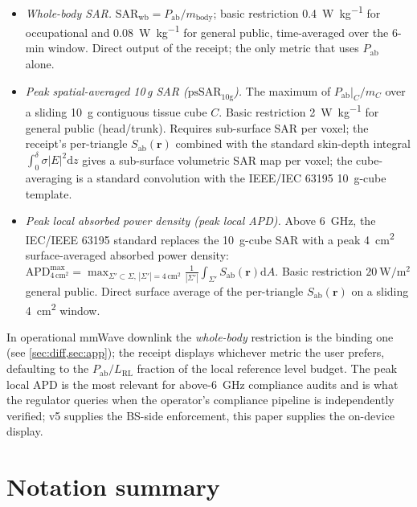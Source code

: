 \documentclass[11pt,a4paper]{article}
\theoremstyle{definition}
\newcommand{\rr}{\mathbf{r}}
\newcommand{\Sab}{S_{\mathrm{ab}}}
\newcommand{\diff}{\mathrm{d}}
\newcommand{\Pabs}{P_{\mathrm{ab}}}
\begin{document}
\begin{itemize}[leftmargin=1.6em,itemsep=2pt]
\item \emph{Whole-body SAR.}  $\mathrm{SAR}_{\mathrm{wb}}=
\Pabs/m_{\mathrm{body}}$; basic restriction
\SI{0.4}{\W\per\kg} for occupational and \SI{0.08}{\W\per\kg} for
general public, time-averaged over the 6-min window.  Direct
output of the receipt; the only metric that uses $\Pabs$ alone.
\item \emph{Peak spatial-averaged 10\,g SAR ($\mathrm{psSAR}_{10\mathrm{g}}$).}
The maximum of $\Pabs|_C/m_C$ over a sliding \SI{10}{\g}
contiguous tissue cube $C$.  Basic restriction
\SI{2}{\W\per\kg} for general public (head/trunk).  Requires
sub-surface SAR per voxel; the receipt's per-triangle $\Sab(\rr)$
combined with the standard skin-depth integral
$\int_0^{\delta}\sigma|E|^2\diff z$ gives a sub-surface volumetric
SAR map per voxel; the cube-averaging is a standard convolution
with the IEEE/IEC 63195 \SI{10}{\g}-cube template.
\item \emph{Peak local absorbed power density (peak local APD).}
Above \SI{6}{\GHz}, the IEC/IEEE 63195 standard replaces the
\SI{10}{\g}-cube SAR with a peak \SI{4}{\square\centi\meter}
surface-averaged absorbed power density:
$\mathrm{APD}^{\max}_{4\,\mathrm{cm}^2}=\max_{\Sigma'\subset
\Sigma,\,|\Sigma'|=4\,\mathrm{cm}^2}\frac{1}{|\Sigma'|}
\int_{\Sigma'}\Sab(\rr)\diff A$.
Basic restriction $\SI{20}{\W\per\square\meter}$ general public.
Direct surface average of the per-triangle $\Sab(\rr)$ on a sliding
\SI{4}{\square\centi\meter} window.
\end{itemize}

In operational mmWave downlink the
\emph{whole-body} restriction is the binding one (see
\cref{sec:diff,sec:app}); the receipt displays whichever metric
the user prefers, defaulting to the
$\Pabs/L_{\mathrm{RL}}$ fraction of the local reference level
budget.  The peak local APD is the most relevant for
above-\SI{6}{\GHz} compliance audits and is what the regulator
queries when the operator's compliance pipeline is independently
verified; v5 supplies the BS-side enforcement, this paper supplies
the on-device display.

\section{Notation summary}\label{sec:notation}
\end{document}

